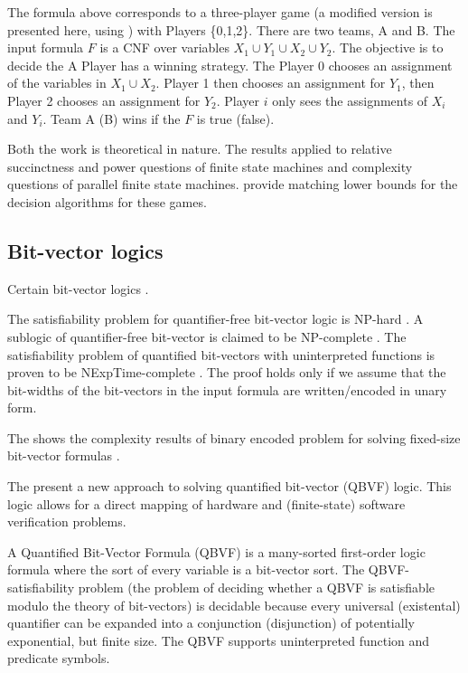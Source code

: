 \documentclass[runningheads]{llncs}
\begin{document}
The formula above corresponds to a three-player game (a modified version is presented here, using \cite{hearn06}) with Players \{0,1,2\}.
There are two teams, A and B.
The input formula $F$ is a CNF over variables $X_1 \cup Y_1 \cup X_2 \cup Y_2$.
The objective is to decide the A Player has a winning strategy.
The Player 0 chooses an assignment of the variables in $X_1 \cup X_2$.
Player 1 then chooses an assignment for $Y_1$, then Player 2 chooses an assignment for $Y_2$.
Player $i$ only sees the assignments of $X_i$ and $Y_i$. Team A (B) wins if the $F$ is true (false).

Both the work \cite{petersonr79, peterson2001lower} is theoretical in nature. The results applied to relative succinctness and power questions of finite state machines and complexity questions of parallel finite state machines.
\cite{peterson2001lower} provide matching lower bounds for the decision algorithms for these games.

\subsection{Bit-vector logics}\label{subsec:bitvectors}
Certain bit-vector logics \cite{kovasznaifb12, wintersteigerhm10}.

The satisfiability problem for quantifier-free bit-vector logic is NP-hard \cite{barrettdl98}.
A sublogic of quantifier-free bit-vector is claimed to be NP-complete \cite{bruttomessos09}.
The satisfiability problem of quantified bit-vectors with uninterpreted functions is proven to be NExpTime-complete \cite{wintersteiger2011termination, wintersteigerhm10, wintersteigerhm13}.
The proof holds only if we assume that the bit-widths of the bit-vectors in the input formula are written/encoded
in unary form.

The \cite{kovasznaifb12} shows the complexity results of binary encoded problem for solving fixed-size bit-vector formulas .

The \cite{wintersteigerhm10, wintersteigerhm13} present a new approach to solving quantified bit-vector (QBVF) logic.
This logic allows for a direct mapping of
hardware and (finite-state) software verification problems.

A Quantified Bit-Vector Formula (QBVF) is a many-sorted
first-order logic formula where the sort of every variable
is a bit-vector sort.
The QBVF-satisfiability problem (the problem of deciding whether a QBVF is satisfiable modulo the theory of bit-vectors) is decidable because every universal (existental) quantifier can be expanded into a conjunction (disjunction) of potentially exponential, but finite size.
The QBVF supports uninterpreted function and predicate symbols.
\end{document}
